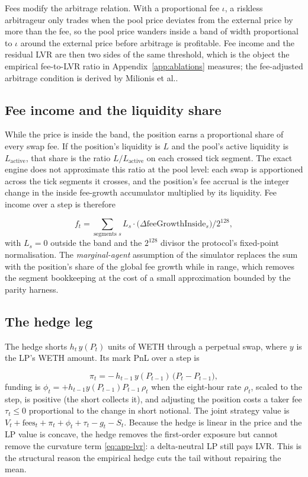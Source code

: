 Fees modify the arbitrage relation. With a proportional fee $\iota$, a
riskless arbitrageur only trades when the pool price deviates from the external
price by more than the fee, so the pool price wanders inside a band of width
proportional to $\iota$ around the external price before arbitrage is
profitable. Fee income and the residual LVR are then two sides of the same
threshold, which is the object the empirical fee-to-LVR ratio in
Appendix~\ref{app:ablations} measures; the fee-adjusted arbitrage condition is
derived by Milionis et al.\cite{milionis2023fees}.

\subsection{Fee income and the liquidity share}

While the price is inside the band, the position earns a proportional share of
every swap fee. If the position's liquidity is $L$ and the pool's active
liquidity is $L_{\text{active}}$, that share is the ratio $L/L_{\text{active}}$
on each crossed tick segment. The exact engine does not approximate this ratio
at the pool level: each swap is apportioned across the tick segments it
crosses, and the position's fee accrual is the integer change in the inside
fee-growth accumulator multiplied by its liquidity. Fee income over a step is
therefore

\begin{equation}
f_t = \sum_{\text{segments } s} L_s \cdot
\big(\Delta \text{feeGrowthInside}_s\big) \big/ 2^{128} ,
\label{eq:app-fee}
\end{equation}
with $L_s=0$ outside the band and the $2^{128}$ divisor the protocol's
fixed-point normalisation. The \emph{marginal-agent} assumption of the
simulator replaces the sum with the position's share of the global fee growth
while in range, which removes the segment bookkeeping at the cost of a small
approximation bounded by the parity harness.

\subsection{The hedge leg}

The hedge shorts $h_t\,y(P_t)$ units of WETH through a perpetual swap, where
$y$ is the LP's WETH amount. Its mark PnL over a step is

\begin{equation}
\pi_t = -\,h_{t-1}\,y(P_{t-1})\,\big(P_t-P_{t-1}\big),
\label{eq:app-hedge-pnl}
\end{equation}
funding is $\phi_t=+h_{t-1}y(P_{t-1})P_{t-1}\,\rho_t$ when the eight-hour
rate $\rho_t$, scaled to the step, is positive (the short collects it), and
adjusting the position costs a taker fee $\tau_t\le0$ proportional to the
change in short notional. The joint
strategy value is $V_t+\text{fees}_t+\pi_t+\phi_t+\tau_t-g_t-S_t$. Because the
hedge is linear in the price and the LP value is concave, the hedge removes
the first-order exposure but cannot remove the curvature term
\eqref{eq:app-lvr}: a delta-neutral LP still pays LVR. This is the structural
reason the empirical hedge cuts the tail without repairing the mean.

